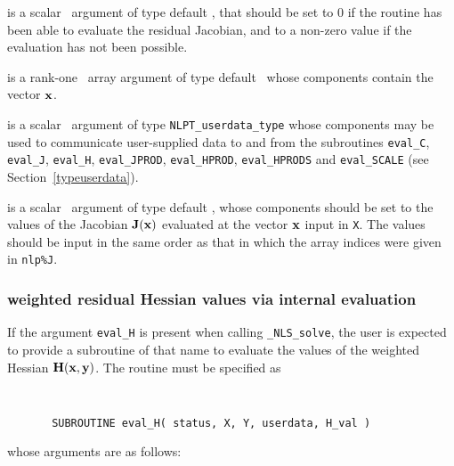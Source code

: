 \documentclass{galahad}
\newcommand{\packagename}{NLS}
\newcommand{\fullpackagename}{\libraryname\_\packagename}
\newcommand{\solver}{{\tt \fullpackagename\_solve}}
\begin{document}
\begin{description}
 is a scalar \intentout\ argument of type default \integer,
that should be set to 0 if the routine has been able to evaluate
the residual Jacobian,
and to a non-zero value if the evaluation has not been possible.

 is a rank-one \intentin\ array argument of type default \realdp\
whose components contain the vector ${\mathbf{x}}$.

 is a scalar \intentinout\ argument of type
{\tt NLPT\_userdata\_type} whose components may be used
to communicate user-supplied data to and from the subroutines
{\tt eval\_C}, {\tt eval\_J}, {\tt eval\_H}, {\tt eval\_JPROD},
{\tt eval\_HPROD}, {\tt eval\_HPRODS} and {\tt eval\_SCALE}
(see Section~\ref{typeuserdata}).

 is a scalar \intentout\ argument of type default \realdp,
whose components should be set to the values
of the Jacobian ${\mathbf{J}}({\mathbf{x}})$
evaluated at the vector ${\mathbf{x}}$ input in {\tt X}.
The values should
be input in the same order as that in which the array indices were
given in {\tt nlp\%J}.

\end{description}


\subsubsection{weighted residual Hessian values via internal evaluation\label{hfv}}

If the argument {\tt eval\_H} is present when calling \solver, the
user is expected to provide a subroutine of that name to evaluate the
values of the weighted Hessian ${\mathbf{H}}({\mathbf{x}},{\mathbf{y}})$.
The routine must be specified as

\def\baselinestretch{0.8}
{\tt
\begin{verbatim}
       SUBROUTINE eval_H( status, X, Y, userdata, H_val )
\end{verbatim} }
\def\baselinestretch{1.0}
\noindent whose arguments are as follows:
\end{document}
